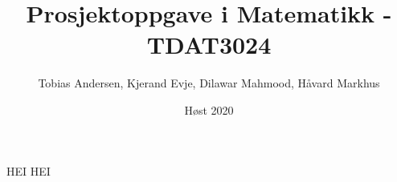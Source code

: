 \documentclass{article}
\title{Prosjektoppgave i Matematikk - TDAT3024}
\author{Tobias Andersen, Kjerand Evje, Dilawar Mahmood, Håvard Markhus}
\date{Høst 2020}
\begin{document}
\maketitle
HEI HEI
\newpage
\tableofcontents
\newpage
\end{document}
